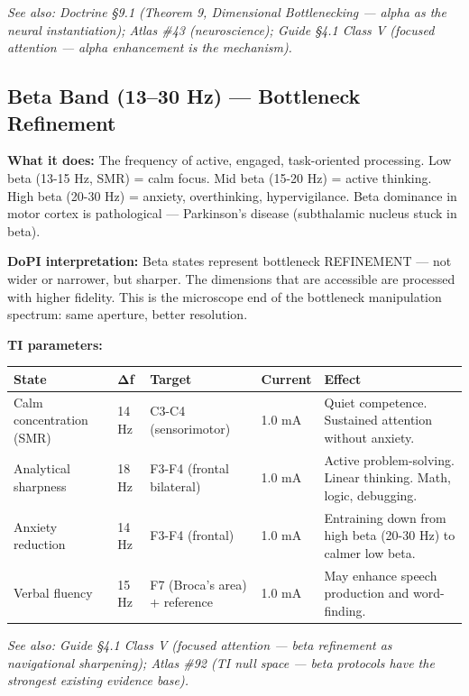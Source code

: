 \textit{See also: Doctrine §9.1 (Theorem 9, Dimensional Bottlenecking — alpha as the neural instantiation); Atlas \#43 (neuroscience); Guide §4.1 Class V (focused attention — alpha enhancement is the mechanism).}


\bigskip\noindent\makebox[\textwidth]{\color{rulegray}\rule{5cm}{0.3pt}}\bigskip


\subsection*{Beta Band (13–30 Hz) — Bottleneck Refinement}


\textbf{What it does:} The frequency of active, engaged, task-oriented processing. Low beta (13-15 Hz, SMR) = calm focus. Mid beta (15-20 Hz) = active thinking. High beta (20-30 Hz) = anxiety, overthinking, hypervigilance. Beta dominance in motor cortex is pathological — Parkinson's disease (subthalamic nucleus stuck in beta).


\textbf{DoPI interpretation:} Beta states represent bottleneck REFINEMENT — not wider or narrower, but sharper. The dimensions that are accessible are processed with higher fidelity. This is the microscope end of the bottleneck manipulation spectrum: same aperture, better resolution.


\textbf{TI parameters:}



\begin{longtable}{p{} p{} p{} p{} p{}}
\toprule
\textbf{State} & \textbf{Δf} & \textbf{Target} & \textbf{Current} & \textbf{Effect} \\
\midrule
\endhead
Calm concentration (SMR) & 14 Hz & C3-C4 (sensorimotor) & 1.0 mA & Quiet competence. Sustained attention without anxiety. \\
Analytical sharpness & 18 Hz & F3-F4 (frontal bilateral) & 1.0 mA & Active problem-solving. Linear thinking. Math, logic, debugging. \\
Anxiety reduction & 14 Hz & F3-F4 (frontal) & 1.0 mA & Entraining down from high beta (20-30 Hz) to calmer low beta. \\
Verbal fluency & 15 Hz & F7 (Broca's area) + reference & 1.0 mA & May enhance speech production and word-finding. \\
\bottomrule
\end{longtable}



\textit{See also: Guide §4.1 Class V (focused attention — beta refinement as navigational sharpening); Atlas \#92 (TI null space — beta protocols have the strongest existing evidence base).}


